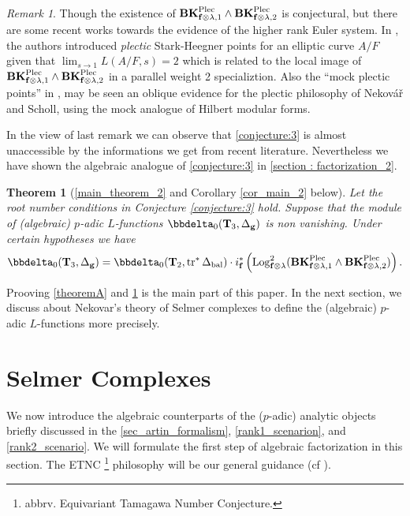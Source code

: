 \documentclass[10pt]{amsart}
\numberwithin{equation}{section}
\newtheorem{introtheorem}{Theorem} %
\theoremstyle{definition}
\theoremstyle{remark} %
\newtheorem{rmk}[thm]{Remark}
\newcommand{\Log}{\operatorname{Log}}
\renewcommand{\b}{\mathrm{bal}}
\newcommand{\f}{\mathbf{f}}
\newcommand{\g}{\mathbf{g}}
\newcommand{\T}{\mathbf{T}}
\begin{document}
	\begin{rmk}
		Though the existence of $ \mathbf{BK}^{\rm Plec}_{\f\otimes \lambda,1} \wedge \mathbf{BK}^{\rm Plec}_{\f\otimes \lambda,2}$ is conjectural, but there are some recent works towards the evidence of the higher rank Euler system. In \cite{fornea23plectic}, the authors introduced \emph{plectic} Stark-Heegner points for an elliptic curve $ A/F $ given that $ \lim_{s\to 1 }L(A/F,s) = 2 $ which is related to the local image of $ \mathbf{BK}^{\rm Plec}_{\f\otimes \lambda,1} \wedge \mathbf{BK}^{\rm Plec}_{\f\otimes \lambda,2}$ in a parallel weight 2 specializtion. Also the \enquote{mock plectic points} in \cite[]{Darmon_Fornea_2025}, may be seen an oblique evidence for the plectic philosophy of Nekovář and Scholl, using the mock analogue of Hilbert modular forms.  
	\end{rmk}
	In the view of last remark we can observe that \cref{conjecture:3} is almost unaccessible by the informations we get from recent literature. Nevertheless we have shown the algebraic analogue of \cref{conjecture:3} in \cref{section : factorization_2}.
	\begin{introtheorem}[\cref{main_theorem_2} and Corollary \ref{cor_main_2} below]
		\label{theoremB}
		Let the root number conditions in Conjecture \ref{conjecture:3} hold. Suppose that the module of (algebraic) $ p $-adic $ L $-functions $ \bbdelta_0(\T_{3}, \Delta_{\g}) $ is non vanishing. Under certain hypotheses we have
		\begin{equation}
			\label{rank2_factorization}
			\bbdelta_0(\T_{3}, \Delta_{\g})  =   \bbdelta_0(\T_2, \operatorname{tr}^*\Delta_{\b})\cdot i^*_\f\left(\Log^2_{\f \otimes \lambda}(\mathbf{BK}^{\rm Plec}_{\f\otimes \lambda,1} \wedge \mathbf{BK}^{\rm Plec}_{\f\otimes \lambda,2} )\right).
		\end{equation} 
	\end{introtheorem}
	
	Prooving \cref{theoremA} and \cref{theoremB} is the main part of this paper. In the next section, we discuss about Nekovar's theory of Selmer complexes to define the (algebraic) $p$-adic $L$-functions more precisely.
	
	
	
	
	
	\section{Selmer Complexes}
	\label{section : Selmer_complexes}
	We now introduce the algebraic counterparts of the ($ p $-adic) analytic objects briefly discussed in the \textsection \ref{sec_artin_formalism}, \textsection \ref{rank1_scenarion}, and \textsection \ref{rank2_scenario}. We will formulate the first step of algebraic factorization in this section. The ETNC \footnote{abbrv. Equivariant Tamagawa Number Conjecture.} philosophy will be our general guidance (cf \cite[Appendix A]{BCS23}).
\end{document}
